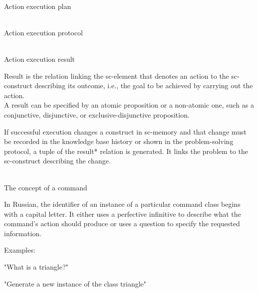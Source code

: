 \begin{frame}{\\Action execution plan}
	\topline
	\justifying
\end{frame}

\begin{frame}{\\Action execution protocol}
	\topline
	\justifying

\end{frame}

\begin{frame}{\\Action execution result}
	\topline
	\justifying

    \bigskip

    Result is the relation linking the sc-element that denotes an action to the sc-construct describing its outcome, i.e., the goal to be achieved by carrying out the action.\\
    A result can be specified by an atomic proposition or a non-atomic one, such as a conjunctive, disjunctive, or exclusive-disjunctive proposition.\\

    \bigskip

    If successful execution changes a construct in sc-memory and that change must be recorded in the knowledge base history or shown in the problem-solving protocol, a tuple of the result* relation is generated. It links the problem to the sc-construct describing the change.
\end{frame}

\begin{frame}{\\The concept of a command}
	\topline
	\justifying
	\vspace{10mm}


   \bigskip

   In Russian, the identifier of an instance of a particular command class begins with a capital letter. It either uses a perfective infinitive to describe what the command's action should produce or uses a question to specify the requested information.

   \bigskip

   Examples:
   \begin{textitemize}
        \item "What is a triangle?"
        \item "Generate a new instance of the class triangle"
   \end{textitemize}

\end{frame}

